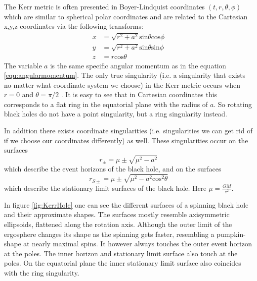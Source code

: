 \documentclass[english, oneside]{HYgradu}
\begin{document}
The Kerr metric is often presented in Boyer-Lindquist coordinates $(t, r, \theta, \phi)$ which are similar to spherical polar coordinates and are related to the Cartesian x,y,z-coordinates via the following transforms:
\begin{align*}
x &= \sqrt{r^2 + a^2} \mathrm{sin}\theta \mathrm{cos}\phi \\
y &= \sqrt{r^2 + a^2} \mathrm{sin}\theta \mathrm{sin}\phi \\
z &= r \mathrm{cos}\theta
\end{align*}
The variable $a$ is the same specific angular momentum as in the equation \ref{equ:angularmomentum}. The only true singularity (i.e. a singularity that exists no matter what coordinate system we choose) in the Kerr metric occurs when $r=0$ and $\theta = \pi/2$ \citep{grintro}. It is easy to see that in Cartesian coordinates this corresponds to a flat ring in the equatorial plane with the radius of $a$. So rotating black holes do not have a point singularity, but a ring singularity instead.

In addition there exists coordinate singularities (i.e. singularities we can get rid of if we choose our coordinates differently) as well. These singularities occur on the surfaces
\begin{equation} \label{equ:evenhorizons}
r_\pm = \mu \pm \sqrt{\mu^2 - a^2}
\end{equation}
which describe the event horizons of the black hole, and on the surfaces
\begin{equation} \label{equ:statlimsurf}
r_{S \pm} = \mu \pm \sqrt{\mu^2 - a^2 \mathrm{cos}^2 \theta}
\end{equation}
which describe the stationary limit surfaces of the black hole. Here $\mu = \frac{GM}{c^2}$. 

In figure \ref{fig:KerrHole} one can see the different surfaces of a spinning black hole and their approximate shapes. The surfaces mostly resemble axisymmetric ellipsoids, flattened along the rotation axis. Although the outer limit of the ergosphere changes its shape as the spinning gets faster, resembling a pumpkin-shape at nearly maximal spins. It however always touches the outer event horizon at the poles. The inner horizon and stationary limit surface also touch at the poles. On the equatorial plane the inner stationary limit surface also coincides with the ring singularity.
\end{document}
